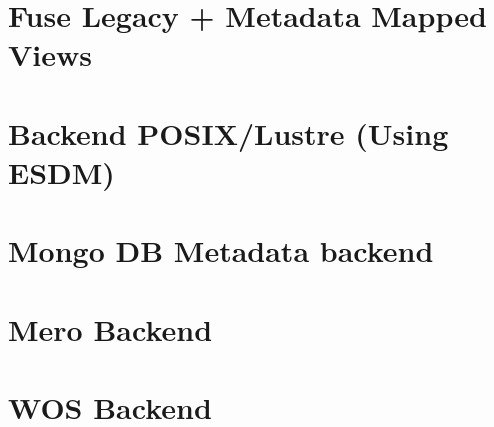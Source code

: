 \clearpage
\section{Fuse Legacy + Metadata Mapped Views}
\label{frontend: fuse}




\clearpage
\section{Backend POSIX/Lustre (Using ESDM)}
\label{backend: posix}



\section{Mongo DB Metadata backend}
\label{backend: mongo}




\clearpage
\section{Mero Backend}
\label{backend: mero}



\clearpage
\section{WOS Backend}
\label{backend: wos}

